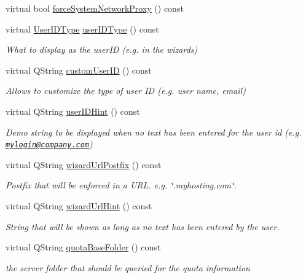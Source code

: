 \begin{DoxyCompactItemize}
\item 
virtual bool \hyperlink{class_o_c_c_1_1_theme_a289cecdb610b6c2590237301cb5eb69f}{force\+System\+Network\+Proxy} () const
\item 
virtual \hyperlink{class_o_c_c_1_1_theme_a134c3c8a839c3cb454b73e8c28f2e6ce}{User\+I\+D\+Type} \hyperlink{class_o_c_c_1_1_theme_ad707332beddeb62a8b1bf248df4e27c4}{user\+I\+D\+Type} () const
\begin{DoxyCompactList}\small\item\em What to display as the user\+ID (e.\+g. in the wizards) \end{DoxyCompactList}\item 
virtual Q\+String \hyperlink{class_o_c_c_1_1_theme_a3f7be01351a7521147b1c9d287d7b9c4}{custom\+User\+ID} () const
\begin{DoxyCompactList}\small\item\em Allows to customize the type of user ID (e.\+g. user name, email) \end{DoxyCompactList}\item 
virtual Q\+String \hyperlink{class_o_c_c_1_1_theme_a1a26fc6ab12fce4b1203c9a0fa15c988}{user\+I\+D\+Hint} () const
\begin{DoxyCompactList}\small\item\em Demo string to be displayed when no text has been entered for the user id (e.\+g. \href{mailto:mylogin@company.com}{\tt mylogin@company.\+com}) \end{DoxyCompactList}\item 
virtual Q\+String \hyperlink{class_o_c_c_1_1_theme_a548a11901b16b99f33b22d3d4ee44868}{wizard\+Url\+Postfix} () const
\begin{DoxyCompactList}\small\item\em Postfix that will be enforced in a U\+RL. e.\+g. \char`\"{}.\+myhosting.\+com\char`\"{}. \end{DoxyCompactList}\item 
virtual Q\+String \hyperlink{class_o_c_c_1_1_theme_a4e652a4d0881175b41218c58e5ca8e85}{wizard\+Url\+Hint} () const
\begin{DoxyCompactList}\small\item\em String that will be shown as long as no text has been entered by the user. \end{DoxyCompactList}\item 
virtual Q\+String \hyperlink{class_o_c_c_1_1_theme_a06d9dfd55efae0fa2dd5b13e829fefea}{quota\+Base\+Folder} () const
\begin{DoxyCompactList}\small\item\em the server folder that should be queried for the quota information \end{DoxyCompactList}\end{DoxyCompactItemize}

